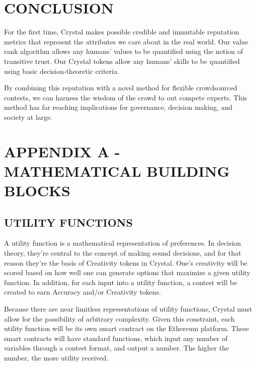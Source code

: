 \section{\texorpdfstring{\protect\hypertarget{_nrd1wyttjja6}{}{\protect\hypertarget{_Toc462050439}{}{}}CONCLUSION}{CONCLUSION}}\label{conclusion}

For the first time, Crystal makes possible credible and immutable
reputation metrics that represent the attributes we care about in the
real world. Our value rank algorithm allows any humans' values to be
quantified using the notion of transitive trust. Our Crystal tokens
allow any humans' skills to be quantified using basic decision-theoretic
criteria.

By combining this reputation with a novel method for flexible
crowdsourced contests, we can harness the wisdom of the crowd to out
compete experts. This method has far reaching implications for
governance, decision making, and society at large.

\section{\texorpdfstring{\protect\hypertarget{_4s1munct24fp}{}{\protect\hypertarget{_Toc462050440}{}{}}APPENDIX
A - MATHEMATICAL BUILDING
BLOCKS}{APPENDIX A - MATHEMATICAL BUILDING BLOCKS}}\label{appendix-a---mathematical-building-blocks}

\subsection{\texorpdfstring{\protect\hypertarget{_h8feeor83qgk}{}{\protect\hypertarget{_Toc462050441}{}{}}UTILITY
FUNCTIONS}{UTILITY FUNCTIONS}}\label{utility-functions}

A utility function is a mathematical representation of preferences. In
decision theory, they're central to the concept of making sound
decisions, and for that reason they're the basis of Creativity tokens in
Crystal. One's creativity will be scored based on how well one can
generate options that maximize a given utility function. In addition,
for each input into a utility function, a contest will be created to
earn Accuracy and/or Creativity tokens.

Because there are near limitless representations of utility functions,
Crystal must allow for the possibility of arbitrary complexity. Given
this constraint, each utility function will be its own smart contract on
the Ethereum platform. These smart contracts will have standard
functions, which input any number of variables through a contest format,
and output a number. The higher the number, the more utility received.

